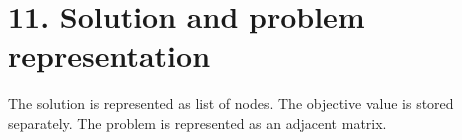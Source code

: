 \section*{11. Solution and problem representation}
The solution is represented as list of nodes. The objective value is stored separately. The problem is represented as an adjacent matrix.